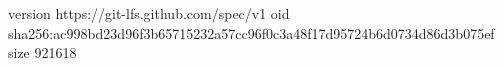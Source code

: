 version https://git-lfs.github.com/spec/v1
oid sha256:ac998bd23d96f3b65715232a57cc96f0c3a48f17d95724b6d0734d86d3b075ef
size 921618
